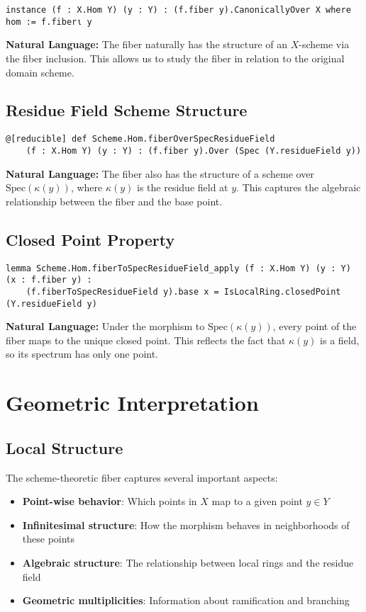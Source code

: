 \documentclass{article}
\theoremstyle{definition}
\begin{document}
\begin{lstlisting}
instance (f : X.Hom Y) (y : Y) : (f.fiber y).CanonicallyOver X where hom := f.fiberι y
\end{lstlisting}

\textbf{Natural Language:} The fiber naturally has the structure of an $X$-scheme via the fiber inclusion. This allows us to study the fiber in relation to the original domain scheme.

\subsection{Residue Field Scheme Structure}

\begin{lstlisting}
@[reducible] def Scheme.Hom.fiberOverSpecResidueField
    (f : X.Hom Y) (y : Y) : (f.fiber y).Over (Spec (Y.residueField y))
\end{lstlisting}

\textbf{Natural Language:} The fiber also has the structure of a scheme over $\mathrm{Spec}(\kappa(y))$, where $\kappa(y)$ is the residue field at $y$. This captures the algebraic relationship between the fiber and the base point.

\subsection{Closed Point Property}

\begin{lstlisting}
lemma Scheme.Hom.fiberToSpecResidueField_apply (f : X.Hom Y) (y : Y) (x : f.fiber y) :
    (f.fiberToSpecResidueField y).base x = IsLocalRing.closedPoint (Y.residueField y)
\end{lstlisting}

\textbf{Natural Language:} Under the morphism to $\mathrm{Spec}(\kappa(y))$, every point of the fiber maps to the unique closed point. This reflects the fact that $\kappa(y)$ is a field, so its spectrum has only one point.

\section{Geometric Interpretation}

\subsection{Local Structure}

The scheme-theoretic fiber captures several important aspects:
\begin{itemize}
\item \textbf{Point-wise behavior}: Which points in $X$ map to a given point $y \in Y$
\item \textbf{Infinitesimal structure}: How the morphism behaves in neighborhoods of these points
\item \textbf{Algebraic structure}: The relationship between local rings and the residue field
\item \textbf{Geometric multiplicities}: Information about ramification and branching
\end{itemize}
\end{document}
